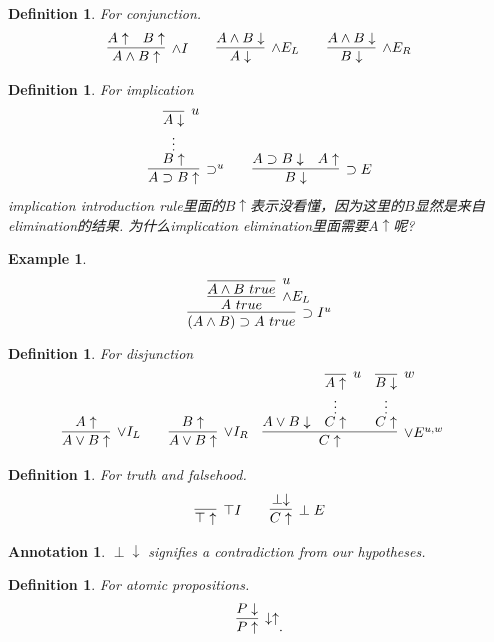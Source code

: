 \documentclass{article}
\theoremstyle{plain}
\newtheorem{example}[theorem]{Example}
\newtheorem{definition}[theorem]{Definition}
\newtheorem{annotation}[theorem]{Annotation}
\theoremstyle{nonumberplain}
\begin{document}
\begin{definition}
\rm For conjunction. 
$$
\begin{aligned}
&\infer[\wedge I]{A \wedge B\uparrow}{A \uparrow & B \uparrow} &&& \infer[\wedge E_L]{A \downarrow}{A \wedge B \downarrow} &&&& \infer[\wedge E_R]{B \downarrow}{A \wedge B \downarrow}
\end{aligned}
$$
\end{definition}


\begin{definition}
\rm For implication
$$
\begin{aligned}
&\infer[\supset^u]{A \supset B \uparrow}{\deduce[\vdots]{B\uparrow}{\infer[u]{A\downarrow}{}}} &&& \infer[\supset E]{B \downarrow}{A \supset B \downarrow & A \uparrow}
\end{aligned}
$$
implication introduction rule里面的$B \uparrow$表示没看懂，因为这里的$B$显然是来自elimination的结果. 为什么implication elimination里面需要$A \uparrow$呢?
\end{definition}

\begin{example}
\rm 
$$
\infer[\supset I^u]{(A \wedge B) \supset A~true}{\infer[\wedge E_L]{A~true}{\infer[u]{A\wedge B~true}{}}}
$$
\end{example}


\begin{definition}
\rm For disjunction
$$
\begin{aligned}
&\infer[\vee I_L]{A \vee B \uparrow}{A \uparrow} &&& \infer[\vee I_R]{A \vee B \uparrow}{B \uparrow} &&&  \infer[\vee E^{u,w}]{C \uparrow}{A \vee B \downarrow & \deduce[\vdots]{C\uparrow}{\infer[u]{A\uparrow}{}} & \deduce[\vdots]{C\uparrow}{\infer[w]{B\downarrow}{}}}
\end{aligned}
$$
\end{definition}


\begin{definition}
\rm For truth and falsehood.
$$
\begin{aligned}
& \infer[\top I]{\top \uparrow}{} &&& \infer[\perp E]{C\uparrow}{\perp \downarrow}
\end{aligned}
$$
\end{definition}

\begin{annotation}
\rm $\perp \downarrow$ signifies a contradiction from our hypotheses.
\end{annotation}

\begin{definition}
\rm For atomic propositions.
$$
\infer[\downarrow\uparrow]{P \uparrow}{P \downarrow}.
$$
\end{definition}
\end{document}
